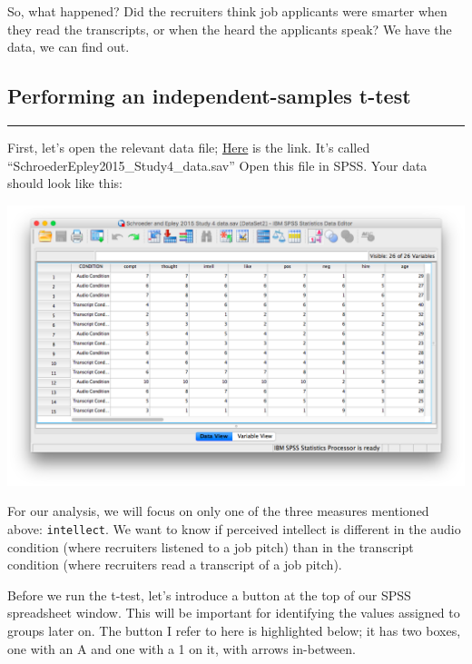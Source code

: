 \documentclass[
]{book}
\begin{document}
So, what happened? Did the recruiters think job applicants were smarter when they read the transcripts, or when the heard the applicants speak? We have the data, we can find out.

\hypertarget{performing-an-independent-samples-t-test}{%
\subsection{Performing an independent-samples t-test}\label{performing-an-independent-samples-t-test}}

\begin{center}\rule{0.5\linewidth}{0.5pt}\end{center}

First, let's open the relevant data file; \href{https://github.com/CrumpLab/statisticsLab/blob/master/data/spssdata/SchroederEpley2015_Study4_data.sav}{Here} is the link. It's called ``SchroederEpley2015\_Study4\_data.sav'' Open this file in SPSS. Your data should look like this:

\includegraphics{img/7.4.11.png}

For our analysis, we will focus on only one of the three measures mentioned above: \texttt{intellect}. We want to know if perceived intellect is different in the audio condition (where recruiters listened to a job pitch) than in the transcript condition (where recruiters read a transcript of a job pitch).

Before we run the t-test, let's introduce a button at the top of our SPSS spreadsheet window. This will be important for identifying the values assigned to groups later on. The button I refer to here is highlighted below; it has two boxes, one with an A and one with a 1 on it, with arrows in-between.
\end{document}
